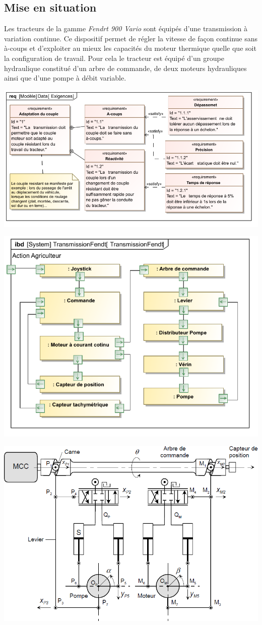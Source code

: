 \documentclass[10pt,fleqn]{article} %
\begin{document}

\vspace{10cm}
\pagestyle{fancy}
\thispagestyle{plain}


\def\columnseprulecolor{\color{ocre}}
\setlength{\columnseprule}{0.4pt} 
\begin{multicols}{2}

\ifprof
\else
\fi
\subsection*{Mise en situation}
\begin{obj} 
\end{obj}
Les tracteurs de la gamme \textit{Fendrt 900 Vario} sont équipés d'une transmission à variation continue. Ce dispositif permet de régler la vitesse de façon continue sans à-coups et d'exploiter au mieux les capacités du moteur thermique quelle que soit la configuration de travail. Pour cela le tracteur est équipé d'un groupe hydraulique constitué d'un arbre de commande, de deux moteurs hydrauliques ainsi que d'une pompe à débit variable.
\begin{center}
\includegraphics[width=.48\textwidth]{images/req}
\end{center}

\begin{center}
\includegraphics[width=.48\textwidth]{images/ibd.pdf}
\end{center}

\begin{center}
\includegraphics[width=.45\textwidth]{images/CommandeTransmission}
\end{center}


\end{multicols}
\end{document}
